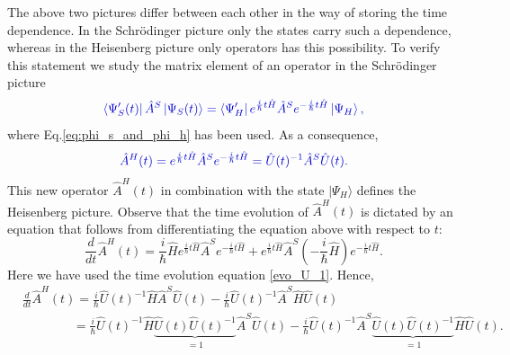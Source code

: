 \documentclass[12pt, titlepage]{article}
\begin{document}
The above two pictures differ between each other in the way of storing the time dependence. In the Schrödinger picture only the states carry such a dependence, whereas in the Heisenberg picture only operators has this possibility. To verify this statement we study the matrix element of an operator in the Schrödinger picture
\begin{equation}\label{eq:matrix_ele_time_dep}
\textcolor[RGB]{0,0,204}{
\bra{\Psi^{\prime}_{S}(t)}\hat{A}^{S}\ket{\Psi_{S} (t)}
=\bra{\Psi^{\prime}_{H}}e^{\frac{i}{\hbar}t\hat{H}}\hat{A}^{S}
e^{-\frac{i}{\hbar}t\hat{H}}\ket{\Psi_{H} },
}
\end{equation}
where Eq.\enskip\eqref{eq:phi_s_and_phi_h} has been used. As a consequence, 
\begin{equation}\label{eq:S-H-Operator_Trafo}
\textcolor[RGB]{0,0,204}{
\hat{A}^{H}(t)=e^{\frac{i}{\hbar}t\hat{H}}\hat{A}^{S}
e^{-\frac{i}{\hbar}t\hat{H}}=\hat{U}(t)^{-1}\hat{A}^{S}\hat{U}(t).
}
\end{equation}
This new operator $ \hat{A}^{H}(t) $ in combination with the state $ \vert\Psi_{H} \rangle$ defines the Heisenberg picture. Observe that the time evolution of $ \hat{A}^{H}(t) $  is dictated by an equation that follows from differentiating the equation above with respect to $ t $:
\begin{equation}
\frac{d}{dt}\hat{A}^{H}(t)
=\frac{i}{\hbar}\hat{H}
e^{\frac{i}{\hbar}t \hat{H}}
\hat{A}^{S}
e^{-\frac{i}{\hbar}t \hat{H}}
+e^{\frac{i}{\hbar}t \hat{H}}
\hat{A}^{S}
\left( -\frac{i}{\hbar}\hat{H}\right) 
e^{-\frac{i}{\hbar}t \hat{H}}.
\end{equation}
Here we have used the  time evolution equation \eqref{evo_U_1}. Hence,
\begin{equation}\label{time_evo_seven}
\begin{split}
&\frac{d}{dt}\hat{A}^{H}(t)
	=\frac{i}{\hbar}
	\hat{U}(t)^{-1}\hat{H}\hat{A}^{S}\hat{U}(t)
	-
	\frac{i}{\hbar}
	\hat{U}(t)^{-1}\hat{A}^{S}\hat{H}\hat{U}(t)
	\\
&\qquad\qquad=\frac{i}{\hbar}
	\hat{U}(t)^{-1}\hat{H}\underbrace{\hat{U}(t)\hat{U}(t)^{-1}}_{=1}\hat{A}^{S}\hat{U}(t)
	-
	\frac{i}{\hbar}
	\hat{U}(t)^{-1}\hat{A}^{S}\underbrace{\hat{U}(t)\hat{U}(t)^{-1}}_{=1}\hat{H}\hat{U}(t).
\end{split}
\end{equation}
\end{document}
